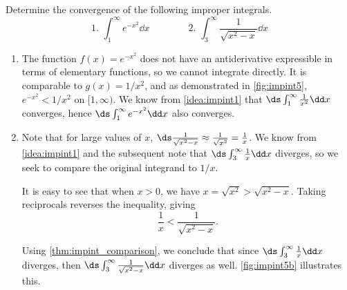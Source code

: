 \begin{example}\label{ex_impint5}%
Determine the convergence of the following improper integrals.
\[
 \text{1. }\int_1^\infty e^{-x^2}\dd x\qquad\qquad
 \text{2. }\int_3^\infty \frac{1}{\sqrt{x^2-x}}\dd x
\]
\solution
\begin{enumerate}
\item		The function $f(x) = e^{-x^2}$ does not have an antiderivative expressible in terms of elementary functions, so we cannot integrate directly. It is comparable to $g(x)=1/x^2$, and as demonstrated in \autoref{fig:impint5}, $e^{-x^2} < 1/x^2$ on $[1,\infty)$. We know from \autoref{idea:impint1} that $\ds \int_1^\infty \frac{1}{x^2}\dd x$ converges, hence $\ds\int_1^\infty e^{-x^2}\dd x$ also converges.


\item		Note that for large values of $x$, $\ds \frac{1}{\sqrt{x^2-x}} \approx \frac{1}{\sqrt{x^2}} =\frac{1}{x}$. We know from \autoref{idea:impint1} and the subsequent note that  $\ds \int_3^\infty \frac1x\dd x$ diverges, so we seek to compare the original integrand to $1/x$.

It is easy to see that when $x>0$, we have $x = \sqrt{x^2} > \sqrt{x^2-x}$. Taking reciprocals reverses the inequality, giving
\[\frac1x < \frac1{\sqrt{x^2-x}}.\]

Using \autoref{thm:impint_comparison}, we conclude that since $\ds\int_3^\infty\frac1x\dd x$ diverges, then $\ds\int_3^\infty\frac1{\sqrt{x^2-x}}\dd x$ diverges as well. \autoref{fig:impint5b} illustrates this.


\end{enumerate}
\end{example}
